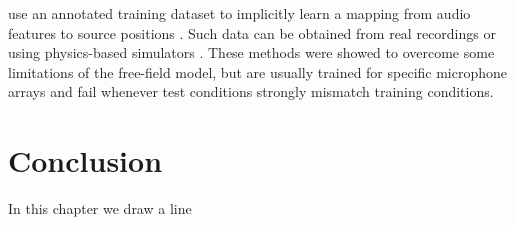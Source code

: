 use an annotated training dataset to implicitly
learn a mapping from audio features to source positions
\cite{deleforge2015acoustic, Vesperini2016, Adavanne2017,  Perotin2018, gaultier2017vast}.
Such data can be obtained from real recordings \cite{deleforge2015acoustic} or
using physics-based simulators \cite{Vesperini2016, Adavanne2017,  Perotin2018, gaultier2017vast}.
These methods were showed to overcome some limitations of the free-field model,
but are usually trained for specific microphone arrays and fail whenever test conditions strongly mismatch training conditions.






\section{Conclusion}\label{sec:application:conclusion}
In this chapter we draw a line

